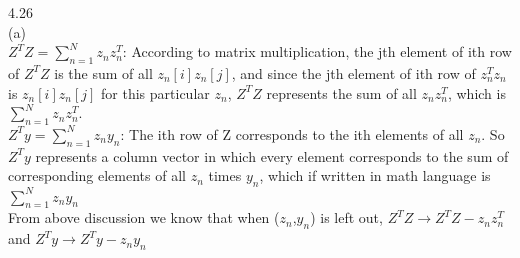 \documentclass[12pt]{article}
\begin{document}
4.26\\
(a)\\
$Z^TZ=\sum_{n=1}^Nz_nz_n^T$: According to matrix multiplication, the jth element of ith row of $Z^TZ$ is the sum of all $z_n[i]z_n[j]$, and since the jth element of ith row of $z_n^Tz_n$ is $z_n[i]z_n[j]$ for this particular $z_n$, $Z^TZ$ represents the sum of all $z_nz_n^T$, which is $\sum_{n=1}^Nz_nz_n^T$.\\
$Z^Ty=\sum_{n=1}^Nz_ny_n$: The ith row of Z corresponds to the ith elements of all $z_n$. So $Z^Ty$ represents a column vector in which every element corresponds to the sum of corresponding elements of all $z_n$ times $y_n$, which if written in math language is $\sum_{n=1}^Nz_ny_n$\\
From  above discussion we know that when ($z_n$,$y_n$) is left out, $Z^TZ\longrightarrow Z^TZ-z_nz_n^T$ and $Z^Ty\longrightarrow Z^Ty-z_ny_n$
\end{document}
